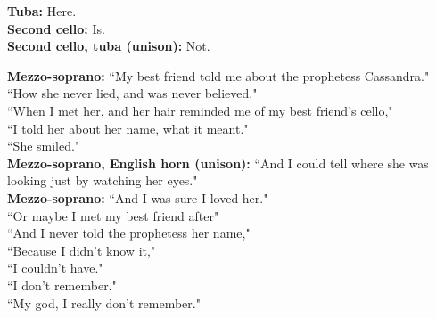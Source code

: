 \documentclass[11pt]{article}
\begin{document}
\begingroup
\textbf{Tuba:} Here. \\ \textbf{Second cello:}  Is. \\ \textbf{Second cello, tuba (unison):} Not.
\endgroup

\begingroup
\textbf{Mezzo-soprano:} ``My best friend told me about the prophetess Cassandra." \\ ``How she never lied, and was never believed." \\ ``When I met her, and her hair reminded me of my best friend's cello," \\ ``I told her about her name, what it meant." \\ ``She smiled." \\ \textbf{Mezzo-soprano, English horn (unison):} ``And I could tell where she was looking just by watching her eyes." \\ \textbf{Mezzo-soprano:} ``And I was sure I loved her." \\ ``Or maybe I met my best friend after" \\ ``And I never told the prophetess her name," \\ ``Because I didn't know it," \\ ``I couldn't have." \\ ``I don't remember." \\ ``My god, I really don't remember."
\endgroup
\end{document}
